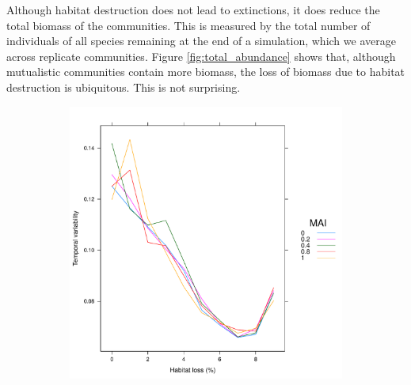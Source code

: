 Although habitat destruction does not lead to extinctions, it does reduce the total biomass of the communities. This is measured by the total number of individuals of all species remaining at the end of a simulation, which we average across replicate communities. Figure \ref{fig:total_abundance} shows that, although mutualistic communities contain more biomass, the loss of biomass due to habitat destruction is ubiquitous. This is not surprising.

\begin{figure} 
		\centering      
        \begin{subfigure}[b]{0.5\textwidth}
                \includegraphics[width=\textwidth]{"random_plots/mean_cv"}
        \end{subfigure}%
        ~
        \begin{subfigure}[b]{0.5\textwidth}

\end{subfigure}
\end{figure}
